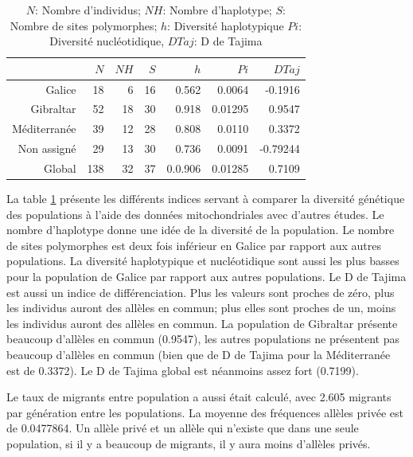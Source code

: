 \documentclass[a4paper,12pt,twoside]{article}\usepackage[]{graphicx}\usepackage[]{color}
\begin{document}
\begin {bibunit} [newbst]
\begin{table}[!]
\centering
\caption[Table des indices génétiques pour les ADN mitochondriaux \label{mito}]{$N$: Nombre d'individus; $NH$: Nombre d'haplotype; $S$: Nombre de sites polymorphes; $h$: Diversité haplotypique $Pi$: Diversité nucléotidique, $D Taj$: D de Tajima}
\label{mito}
\begin{tabular}{rrrrrrr}
\toprule
 & $N$	&	$NH$	&	$S$	&	$h$	&	$Pi$	& $D Taj$\\
\hline
Galice &	18	&	6	&	16	&	0.562	&	0.0064 & -0.1916	\\
Gibraltar &	52	&	18	&	30	&	0.918	&	0.01295 & 0.9547	\\
Méditerranée &	39	&	12	&	28	&	0.808	&	0.0110	& 0.3372 \\
Non assigné	&	29	&	13	&	30	&	0.736	&	0.0091	& -0.79244	\\
\midrule
Global &	138	&	32	&	37	&	0.0.906	&	0.01285 & 0.7109	\\
\bottomrule
\end{tabular}
\end{table}

La table \ref{mito} présente les différents indices servant à comparer la diversité génétique des populations à l'aide des données mitochondriales avec d'autres études. Le nombre d'haplotype donne une idée de la diversité de la population. Le nombre de sites polymorphes est deux fois inférieur en Galice par rapport aux autres populations. La diversité haplotypique et nucléotidique sont aussi les plus basses pour la population de Galice par rapport aux autres populations. Le D de Tajima est aussi un indice de différenciation. Plus les valeurs sont proches de zéro, plus les individus auront des allèles en commun; plus elles sont proches de un, moins les individus auront des allèles en commun. La population de Gibraltar présente beaucoup d'allèles en commun (0.9547), les autres populations ne présentent pas beaucoup d'allèles en commun (bien que de D de Tajima pour la Méditerranée est de 0.3372). Le D de Tajima global est néanmoins assez fort (0.7199).

Le taux de migrants entre population a aussi était calculé, avec 2.605 migrants par génération entre les populations. La moyenne des fréquences allèles privée est de 0.0477864. Un allèle privé et un allèle qui n'existe que dans une seule population, si il y a beaucoup de migrants, il y aura moins d'allèles privés.


\end{bibunit}
\end{document}
